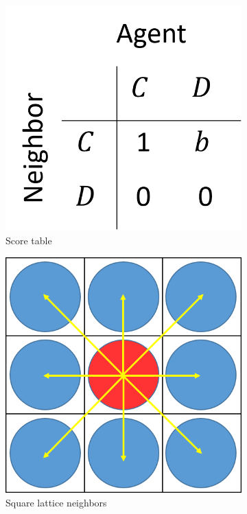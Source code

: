\documentclass[a4paper]{jpconf}
\begin{document}
\begin{figure}[h]
	\centering
	\begin{subfigure}[b]{0.4\textwidth}
		\includegraphics[width = \textwidth]{Game_score_table.png}
		\caption{Score table}	
		\label{fig:score table}	
	\end{subfigure}
	\begin{subfigure}[b]{0.4\textwidth}
		\includegraphics[width = \textwidth]{Games_with_neighbors_pic.png}
		\caption{Square lattice neighbors}
	\end{subfigure}
	\caption{}
\end{figure}
\end{document}
